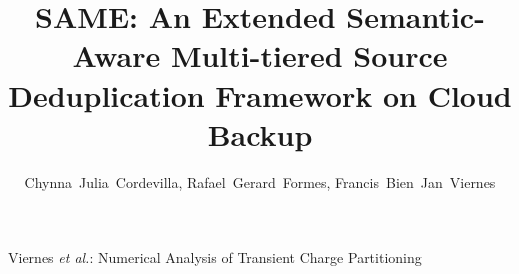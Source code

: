 \documentclass[journal]{IEEEtran}
\begin{document}
%
\title{SAME: An Extended Semantic-Aware Multi-tiered Source Deduplication Framework on Cloud Backup}
%
%
%

\author{{Chynna~Julia~Cordevilla, Rafael~Gerard~Formes, Francis~Bien~Jan~Viernes}%
}

% 
%



%
{Viernes \MakeLowercase{\textit{et al.}}: Numerical Analysis of Transient Charge Partitioning}
% 




\end{document}
